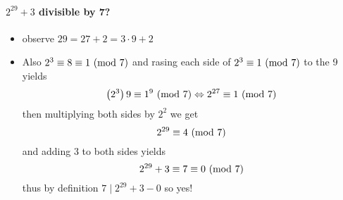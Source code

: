 \documentclass[11pt]{book}
\begin{document}
\paragraph{$2^{29}  + 3$ divisible by 7?} 
\begin{itemize}
    \item observe $29 = 27 + 2 = 3  \cdot 9  + 2$ 
    \item Also $2^{3}  \equiv 8 \equiv 1 \ (\mathrm{mod}\ 7) $ and rasing each side of $2^{3}  \equiv 1 \ (\mathrm{mod}\ 7) $ to the 9 yields 
        \[
            \left( 2^{3}  \right) 9 \equiv 1^{9}  \ (\mathrm{mod}\ 7) \Leftrightarrow 2^{27}  \equiv 1 \ (\mathrm{mod}\ 7) 
        \]
        then multiplying both sides by $2^{2} $ we get
        \[
        2^{29}  \equiv 4 \ (\mathrm{mod}\ 7) 
        \]
        and adding $3$ to both sides yields 
        \[
            2^{29}  + 3 \equiv 7 \equiv 0 \ (\mathrm{mod}\ 7) 
        \]
        thus by definition $7 \mid 2^{29}  + 3  - 0$ so yes!
\end{itemize}


\end{document}
